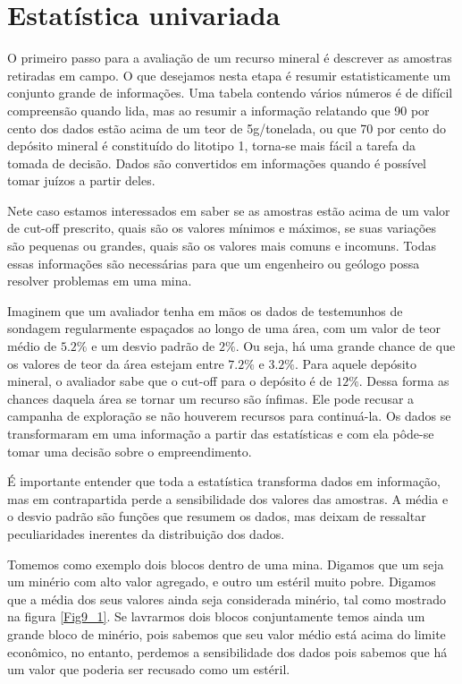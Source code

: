 \chapter{Estatística univariada}

O primeiro passo para a avaliação de um recurso mineral é descrever as amostras retiradas em campo. O que desejamos nesta etapa é resumir estatisticamente um conjunto grande de informações. Uma tabela contendo vários números é de difícil compreensão quando lida, mas ao resumir a informação relatando que 90 por cento dos dados estão acima de um teor de 5g/tonelada, ou que 70 por cento do depósito mineral é constituído do litotipo 1, torna-se mais fácil a tarefa da tomada de decisão. Dados são convertidos em informações quando é possível tomar juízos a partir deles. 

Nete caso estamos interessados em saber se as amostras estão acima de um valor de cut-off prescrito, quais são os valores mínimos e máximos, se suas variações são pequenas ou grandes, quais são os valores mais comuns e incomuns. Todas essas informações são necessárias para que um engenheiro ou geólogo possa resolver problemas em uma mina. 

Imaginem que um avaliador tenha em mãos os dados de testemunhos de sondagem regularmente espaçados ao longo de uma área, com um valor de teor médio de $5.2\%$ e um desvio padrão de $2\%$. Ou seja, há uma grande chance de que os valores de teor da área estejam entre $7.2\%$ e $3.2\%$. Para aquele depósito mineral, o avaliador sabe que o cut-off para o depósito é de $12\%$. Dessa forma as chances daquela área se tornar um recurso são ínfimas. Ele pode recusar a campanha de exploração se não houverem recursos para continuá-la. Os dados se transformaram em uma informação a partir das estatísticas e com ela pôde-se tomar uma decisão sobre o empreendimento.  

É importante entender que toda a estatística transforma dados em informação, mas em contrapartida perde a sensibilidade dos valores das amostras. A média e o desvio padrão são funções que resumem os dados, mas deixam de ressaltar peculiaridades inerentes da distribuição dos dados.

Tomemos como exemplo dois blocos dentro de uma mina. Digamos que um seja um minério com alto valor agregado, e outro um estéril muito pobre. Digamos que a média dos seus valores ainda seja considerada minério, tal como mostrado na figura \ref{Fig9_1}. Se lavrarmos dois blocos conjuntamente temos ainda um grande bloco de minério, pois sabemos que seu valor médio está acima do limite econômico, no entanto, perdemos a sensibilidade dos dados pois sabemos que há um valor que poderia ser recusado como um estéril.


